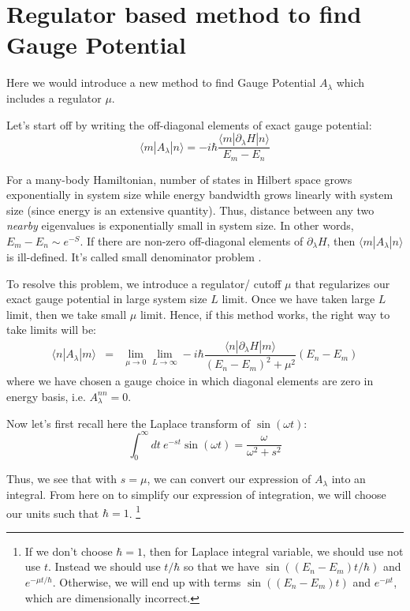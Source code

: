 \documentclass[11pt,a4paper]{article}
\begin{document}
\section{ Regulator based method to find Gauge Potential}
Here we would introduce a new method to find Gauge Potential $A_{\lambda}$ which includes a regulator $\mu$. 

Let's start off by writing the off-diagonal elements of exact gauge potential:
\begin{equation}
\langle m |A_{\lambda} | n \rangle =-i \hbar \dfrac{\langle m |\partial_{\lambda}H | n \rangle}{E_m-E_n}
\end{equation}

For a many-body Hamiltonian, number of states in Hilbert space grows exponentially in system size while energy bandwidth grows linearly with system size (since energy is an extensive quantity). Thus, distance between any two \textit{nearby} eigenvalues is exponentially small in system size. In other words, $E_m-E_n \sim e^{-S}$. If there are non-zero off-diagonal elements of $\partial_{\lambda}H $, then $\langle m |A_{\lambda} | n \rangle$ is ill-defined. It's called small denominator problem \cite{kolodrubetz2016geometry}.


 
To resolve this problem, we introduce a regulator/ cutoff $\mu$ that regularizes our exact gauge potential in large system size $L$ limit. Once we have taken large $L$ limit, then we take small $\mu$ limit. Hence, if this method works, the right way to take limits will be:
\begin{eqnarray}
\langle n | A_{\lambda} | m \rangle &=& \lim_{\mu \rightarrow 0} \lim_{L \rightarrow \infty } -i \hbar \dfrac{\langle n | \partial_{\lambda}H  | m \rangle}{(E_n-E_m)^2 + \mu^2} (E_n-E_m) 
\label{off-digonal}
\end{eqnarray}
where we have chosen a gauge choice in which diagonal elements are zero in energy basis, i.e. $A_{\lambda}^{nn}=0$.

Now  let's first recall here the Laplace transform of $\sin(\omega t)$: 
\begin{equation}
\int_0^{\infty} dt\ e^{-s t} \sin(\omega t)= \dfrac{\omega}{ \omega^2 +s^2}
\end{equation}

Thus, we see that with $s=\mu$, we can convert our expression of $ A_{\lambda}$ into an integral.  
From here on to simplify our expression of integration, we will choose our units such that $\hbar=1$. \footnote{If we don't choose  $\hbar=1$, then for Laplace integral variable, we should use not use $t$. Instead we should use $t/\hbar$ so that we have $\sin((E_n-E_m)t/ \hbar)$ and $e^{-\mu t/ \hbar}$. Otherwise, we will end up with terms $\sin((E_n-E_m)t)$ and $e^{-\mu t}$, which are dimensionally incorrect.}
\end{document}
